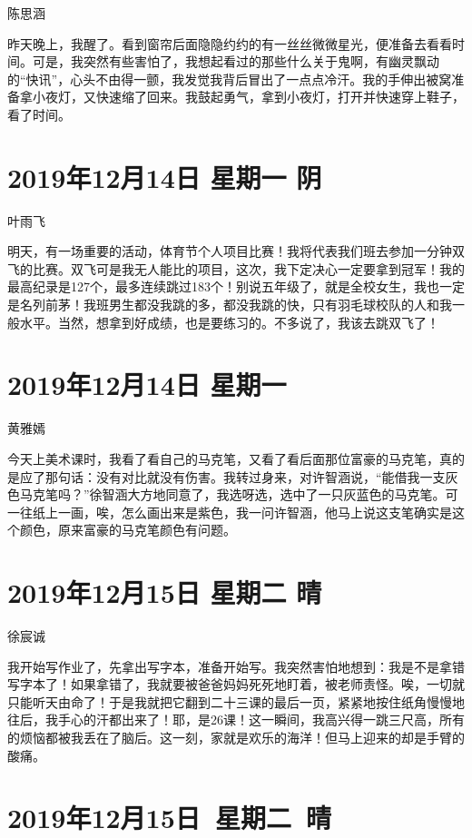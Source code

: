 陈思涵

昨天晚上，我醒了。看到窗帘后面隐隐约约的有一丝丝微微星光，便准备去看看时间。可是，我突然有些害怕了，我想起看过的那些什么关于鬼啊，有幽灵飘动的``快讯''，心头不由得一颤，我发觉我背后冒出了一点点冷汗。我的手伸出被窝准备拿小夜灯，又快速缩了回来。我鼓起勇气，拿到小夜灯，打开并快速穿上鞋子，看了时间。

\section{2019年12月14日 星期一 阴}

叶雨飞

明天，有一场重要的活动，体育节个人项目比赛！我将代表我们班去参加一分钟双飞的比赛。双飞可是我无人能比的项目，这次，我下定决心一定要拿到冠军！我的最高纪录是127个，最多连续跳过183个！别说五年级了，就是全校女生，我也一定是名列前茅！我班男生都没我跳的多，都没我跳的快，只有羽毛球校队的人和我一般水平。当然，想拿到好成绩，也是要练习的。不多说了，我该去跳双飞了！

\section{2019年12月14日 星期一}

黄雅嫣

今天上美术课时，我看了看自己的马克笔，又看了看后面那位富豪的马克笔，真的是应了那句话：没有对比就没有伤害。我转过身来，对许智涵说，``能借我一支灰色马克笔吗？''徐智涵大方地同意了，我选呀选，选中了一只灰蓝色的马克笔。可一往纸上一画，唉，怎么画出来是紫色，我一问许智涵，他马上说这支笔确实是这个颜色，原来富豪的马克笔颜色有问题。

\section{2019年12月15日 星期二 晴}

徐宸诚

我开始写作业了，先拿出写字本，准备开始写。我突然害怕地想到：我是不是拿错写字本了！如果拿错了，我就要被爸爸妈妈死死地盯着，被老师责怪。唉，一切就只能听天由命了！于是我就把它翻到二十三课的最后一页，紧紧地按住纸角慢慢地往后，我手心的汗都出来了！耶，是26课！这一瞬间，我高兴得一跳三尺高，所有的烦恼都被我丢在了脑后。这一刻，家就是欢乐的海洋！但马上迎来的却是手臂的酸痛。

\section{2019年12月15日~星期二~晴}

